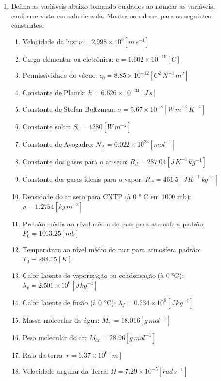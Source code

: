 \documentclass[]{book}
\begin{document}
\begin{enumerate}
\def\labelenumi{\arabic{enumi}.}
\setcounter{enumi}{4}
\item
  Defina as variáveis abaixo tomando cuidados ao nomear as variáveis,
  conforme visto em sala de aula. Mostre os valores para as seguintes
  constantes:

  \begin{enumerate}
  \def\labelenumii{\alph{enumii}.}
  \item
    Velocidade da luz:
    \(\nu = 2.998 \times 10^{8} \left[m \, s^{-1}\right]\)
  \item
    Carga elementar ou eletrônica:
    \(e = 1.602 \times 10^{-19} \left[C\right]\)
  \item
    Permissividade do vácuo:
    \(\epsilon_{0} = 8.85 \times 10^{-12} \left[C^{2} \, N^{-1} \, m^{2}\right]\)
  \item
    Constante de Planck: \(h=6.626 \times 10^{-34} \left[J \, s\right]\)
  \item
    Constante de Stefan Boltzman:
    \(\sigma = 5.67 \times 10^{-8} \left[W \, m^{-2} \, K^{-4}\right]\)\\
  \item
    Constante solar: \(S_{0} = 1380 \left[W \, m^{-2}\right]\)
  \item
    Constante de Avogadro:
    \(N_{A} = 6.022 \times 10^{23} \left[mol^{-1}\right]\)
  \item
    Constante dos gases para o ar seco:
    \(R_{d} = 287.04 \left[J \, K^{-1} \, kg^{-1}\right]\)
  \item
    Constante dos gases ideais para o vapor:
    \(R_{w} = 461.5 \left[J \, K^{-1} \, kg^{-1}\right]\)
  \item
    Densidade do ar seco para CNTP (à 0 ° C em 1000 mb):
    \(\rho=1.2754 \left[kg \, m^{-3}\right]\)
  \item
    Pressão média ao nível médio do mar para atmosfera padrão:
    \(P_{0}=1013.25 \left[mb\right]\)
  \item
    Temperatura ao nível médio do mar para atmosfera padrão:
    \(T_{0}=288.15 \left[K\right]\)
  \item
    Calor latente de vaporização ou condensação (à 0 °C):
    \(\lambda_{v} = 2.501 \times 10^{6}\left[J \, kg^{-1}\right]\)
  \item
    Calor latente de fusão (à 0 °C):
    \(\lambda_{f} = 0.334 \times 10^{6}\left[J \, kg^{-1}\right]\)
  \item
    Massa molecular da água: \(M_w = 18.016 \left[g \, mol^{-1}\right]\)
  \item
    Peso molecular do ar: \(M_{ar} = 28.96 \left[g \, mol^{-1}\right]\)
  \item
    Raio da terra: \(r = 6.37 \times 10^{6} \left[m\right]\)
  \item
    Velocidade angular da Terra:
    \(\Omega=7.29 \times 10^{-5} \left[rad \, s^{-1}\right]\)
  \end{enumerate}
\end{enumerate}
\end{document}
